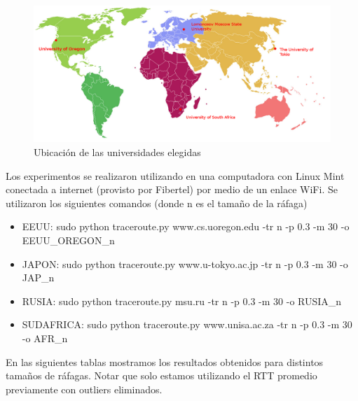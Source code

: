  
\begin{figure}[H]
  \centering
  \includegraphics[scale = 0.3]{imagenes/mapa.png}
  \caption{Ubicación de las universidades elegidas}
  \label{histogramaprobabilidadesModel1}
\end{figure}


Los experimentos se realizaron utilizando en una computadora con Linux Mint conectada a internet (provisto por Fibertel) por medio de un enlace WiFi. Se utilizaron los siguientes comandos (donde n es el tamaño de la ráfaga) 
\begin{itemize}
  \item EEUU:      sudo python traceroute.py www.cs.uoregon.edu -tr n -p 0.3 -m 30 -o EEUU\_OREGON\_n
  \item JAPON:     sudo python traceroute.py www.u-tokyo.ac.jp  -tr n -p 0.3 -m 30 -o JAP\_n
  \item RUSIA:     sudo python traceroute.py msu.ru             -tr n -p 0.3 -m 30 -o RUSIA\_n
  \item SUDAFRICA: sudo python traceroute.py www.unisa.ac.za    -tr n -p 0.3 -m 30 -o AFR\_n 
\end{itemize}

En las siguientes tablas mostramos los resultados obtenidos para distintos tamaños de ráfagas. Notar que solo estamos utilizando el RTT promedio previamente con outliers eliminados.

